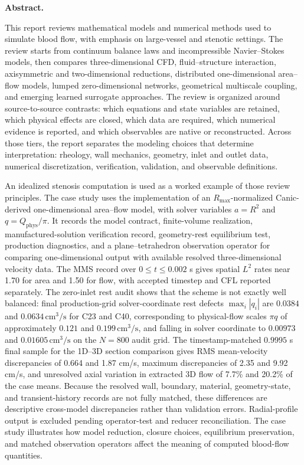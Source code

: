 \medskip
\noindent\textbf{Abstract.}\par\smallskip
This report reviews mathematical models and numerical methods used to simulate
blood flow, with emphasis on large-vessel and stenotic settings. The review
starts from continuum balance laws and incompressible Navier--Stokes models,
then compares three-dimensional CFD, fluid--structure interaction, axisymmetric
and two-dimensional reductions, distributed one-dimensional area--flow models,
lumped zero-dimensional networks, geometrical multiscale coupling, and emerging
learned surrogate approaches. The review is organized around source-to-source
contrasts: which equations and state variables are retained, which physical
effects are closed, which data are required, which numerical evidence is
reported, and which observables are native or reconstructed. Across those
tiers, the report separates the modeling choices that determine interpretation:
rheology, wall mechanics, geometry, inlet and outlet data, numerical
discretization, verification, validation, and observable definitions.

An idealized stenosis computation is used as a worked example of those review
principles. The case study uses the  implementation
of an $R_{\max}$-normalized Canic-derived one-dimensional area--flow model, with
solver variables $a=R^2$ and $q=Q_{\mathrm{phys}}/\pi$. It records the model
contract, finite-volume realization, manufactured-solution verification record,
geometry-rest equilibrium test, production diagnostics, and a
plane--tetrahedron observation operator for comparing one-dimensional output
with available resolved three-dimensional velocity data. The MMS record over
$0\le t\le0.002$ s gives spatial $L^2$ rates near 1.70 for area and 1.50 for
flow, with accepted timestep and CFL reported separately. The zero-inlet rest
audit shows that the scheme is not exactly well balanced: final production-grid
solver-coordinate rest defects $\max_i |q_i|$ are $0.0384$ and
$0.0634\,\mathrm{cm}^3/\mathrm{s}$ for C23 and C40, corresponding to
physical-flow scales $\pi q$ of approximately $0.121$ and
$0.199\,\mathrm{cm}^3/\mathrm{s}$, and falling in solver coordinate to
$0.00973$ and $0.01605\,\mathrm{cm}^3/\mathrm{s}$ on the $N=800$ audit grid.
The timestamp-matched $0.9995$ s final sample for the 1D--3D section comparison
gives RMS mean-velocity discrepancies of 0.664 and 1.87 cm/s, maximum
discrepancies of 2.35 and 9.92 cm/s, and unresolved axial variation in
extracted 3D flow of 7.7\% and 20.2\% of the case means. Because the resolved
wall, boundary, material, geometry-state, and transient-history records are not
fully matched, these differences are descriptive cross-model discrepancies
rather than validation errors. Radial-profile output is excluded pending
operator-test and reducer reconciliation. The case study illustrates how model
reduction, closure choices, equilibrium preservation, and matched observation
operators affect the meaning of computed blood-flow quantities.
